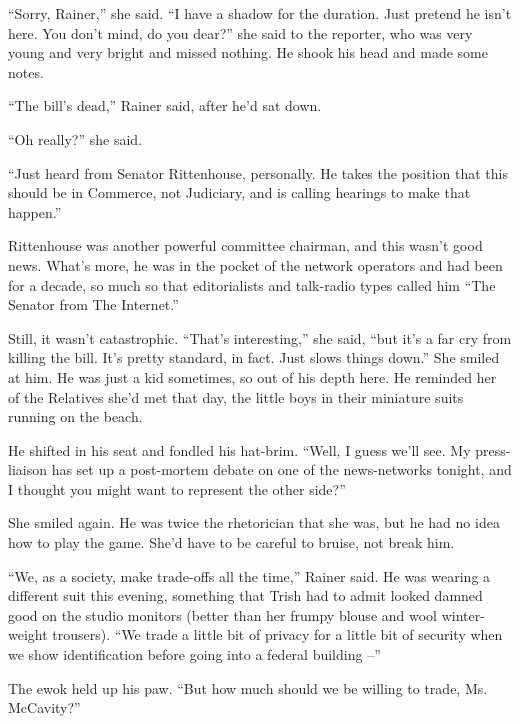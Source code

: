 “Sorry, Rainer,” she said. “I have a shadow for the duration. 
Just pretend he isn't here. You don't mind, do you dear?” she said to 
the reporter, who was very young and very bright and missed nothing. He 
shook his head and made some notes.

“The bill's dead,” Rainer said, after he'd sat down.

“Oh really?” she said.

“Just heard from Senator Rittenhouse, personally. He takes the 
position that this should be in Commerce, not Judiciary, and is calling 
hearings to make that happen.”

Rittenhouse was another powerful committee chairman, and this wasn't 
good news. What's more, he was in the pocket of the network operators 
and had been for a decade, so much so that editorialists and talk-radio 
types called him “The Senator from The Internet.”

Still, it wasn't catastrophic. “That's interesting,” she said, 
“but it's a far cry from killing the bill. It's pretty standard, in 
fact. Just slows things down.” She smiled at him. He was just a kid 
sometimes, so out of his depth here. He reminded her of the Relatives 
she'd met that day, the little boys in their miniature suits running on 
the beach.

He shifted in his seat and fondled his hat-brim. “Well, I guess we'll 
see. My press-liaison has set up a post-mortem debate on one of the 
news-networks tonight, and I thought you might want to represent the 
other side?”

She smiled again. He was twice the rhetorician that she was, but he had 
no idea how to play the game. She'd have to be careful to bruise, not 
break him.

\tb

“We, as a society, make trade-offs all the time,” Rainer said. He 
was wearing a different suit this evening, something that Trish had to 
admit looked damned good on the studio monitors (better than her frumpy 
blouse and wool winter-weight trousers). “We trade a little bit of 
privacy for a little bit of security when we show identification before 
going into a federal building --”

The ewok held up his paw. “But how much should we be willing to 
trade, Ms. McCavity?”


